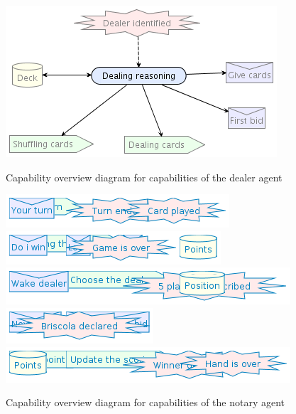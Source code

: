 \documentclass[a4paper]{article}
\begin{document}
\begin{figure}[htp]
  \includegraphics[keepaspectratio,scale=0.45]{pdt/images/detailed_design/dealing_capability_overview_diagram.png}
  \label{fig:dealer-cap}
  \caption{Capability overview diagram for capabilities of the dealer agent}
\end{figure}
\begin{figure}[htp]
  \includegraphics[keepaspectratio,scale=0.45]{pdt/images/detailed_design/turn_selection_capability_overview_diagram.png}
  \includegraphics[keepaspectratio,scale=0.45]{pdt/images/detailed_design/end_the_game_capability_overview_diagram.png}
  \includegraphics[keepaspectratio,scale=0.45]{pdt/images/detailed_design/start_dealing_capability_overview_diagram.png}
  \includegraphics[keepaspectratio,scale=0.45]{pdt/images/detailed_design/control_bidding_capability_overview_diagram.png}
  \includegraphics[keepaspectratio,scale=0.45]{pdt/images/detailed_design/count_points_capability_overview_diagram.png}
  \label{fig:notary-cap}
  \caption{Capability overview diagram for capabilities of the notary agent}
\end{figure}
\end{document}
